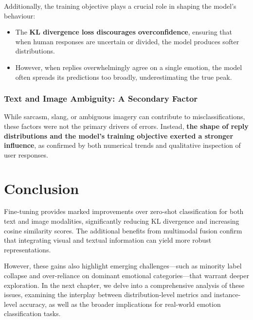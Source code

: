 Additionally, the training objective plays a crucial role in shaping the model’s behaviour:
\begin{itemize}
    \item The \textbf{KL divergence loss discourages overconfidence}, ensuring that when human responses are uncertain or divided, the model produces softer distributions.
    \item However, when replies overwhelmingly agree on a single emotion, the model often spreads its predictions too broadly, underestimating the true peak.
\end{itemize}

\subsubsection*{Text and Image Ambiguity: A Secondary Factor}
While sarcasm, slang, or ambiguous imagery can contribute to misclassifications, these factors were not the primary drivers of errors. Instead, \textbf{the shape of reply distributions and the model's training objective exerted a stronger influence}, as confirmed by both numerical trends and qualitative inspection of user responses.



\section{Conclusion}
\label{sec:conclusion}

Fine-tuning provides marked improvements over zero-shot classification for both text and image modalities, significantly reducing KL divergence and increasing cosine similarity scores. The additional benefits from multimodal fusion confirm that integrating visual and textual information can yield more robust representations.

However, these gains also highlight emerging challenges—such as minority label collapse and over-reliance on dominant emotional categories—that warrant deeper exploration. In the next chapter, we delve into a comprehensive analysis of these issues, examining the interplay between distribution-level metrics and instance-level accuracy, as well as the broader implications for real-world emotion classification tasks.





